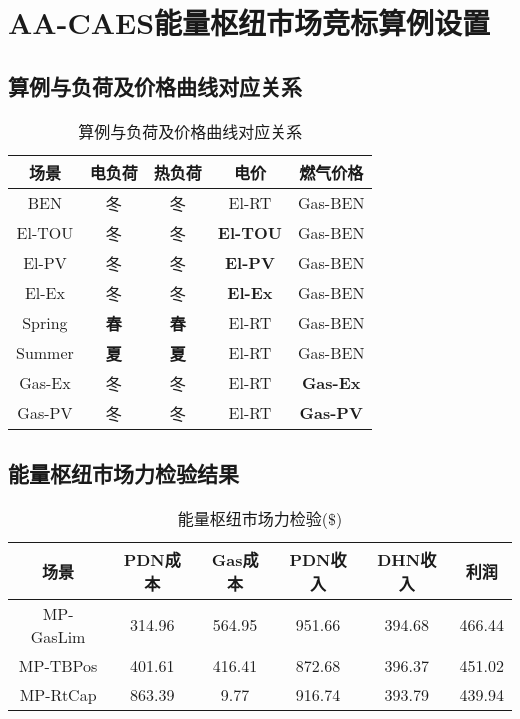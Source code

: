 \chapter{AA-CAES能量枢纽市场竞标算例设置}
\label{cha:aa-caes-case-append}

\section{算例与负荷及价格曲线对应关系}

\begin{table}[!htp]
\scriptsize
\renewcommand{\arraystretch}{1.3}
\renewcommand{\tabcolsep}{1em}
\caption{算例与负荷及价格曲线对应关系}
\centering
\begin{tabular}{ccccc}
\toprule
{场景} & {电负荷} & {热负荷} & {电价} & {燃气价格}  \\
\midrule
BEN      &  冬   &  冬   &  El-RT           &  Gas-BEN \\
El-TOU   &  冬   &  冬   &  \textbf{El-TOU} &  Gas-BEN \\
El-PV    &  冬   &  冬   &  \textbf{El-PV}  &  Gas-BEN \\
El-Ex    &  冬   &  冬   &  \textbf{El-Ex}  &  Gas-BEN \\
Spring   &  \textbf{春}  &  \textbf{春}     &  El-RT   &   Gas-BEN \\
Summer   &  \textbf{夏}  &  \textbf{夏}     &  El-RT   &   Gas-BEN \\
Gas-Ex   &  冬   &  冬    &    El-RT    &   \textbf{Gas-Ex}  \\
Gas-PV   &  冬   &  冬    &    El-RT    &   \textbf{Gas-PV}  \\
\bottomrule
\end{tabular}
\label{tab:Relation}
\end{table}

\section{能量枢纽市场力检验结果}
\begin{table}[!htp]
\scriptsize
\renewcommand{\arraystretch}{1.3}
\renewcommand{\tabcolsep}{1em}
\caption{能量枢纽市场力检验($\$$)}
\centering
\begin{tabular}{cccccc}
\toprule
{场景} & {PDN成本} & {Gas成本} & {PDN收入} & {DHN收入} & {利润}\\
\midrule
MP-GasLim     & 314.96    & 564.95   & 951.66    & 394.68  & 466.44 \\
MP-TBPos      & 401.61    & 416.41   & 872.68    & 396.37  & 451.02 \\
MP-RtCap      & 863.39    & 9.77     & 916.74    & 393.79  & 439.94 \\
\bottomrule
\end{tabular}
\label{tab:MPResults}
\end{table}
